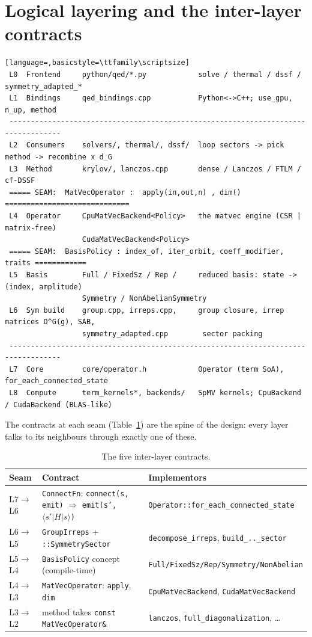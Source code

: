 \documentclass[11pt]{article}
\newcommand{\code}[1]{\texttt{\small #1}}
\begin{document}
\section{Logical layering and the inter-layer contracts}

\begin{center}
\begin{lstlisting}[language=,basicstyle=\ttfamily\scriptsize]
 L0  Frontend     python/qed/*.py            solve / thermal / dssf / symmetry_adapted_*
 L1  Bindings     qed_bindings.cpp           Python<->C++; use_gpu, n_up, method
 ----------------------------------------------------------------------------------
 L2  Consumers    solvers/, thermal/, dssf/  loop sectors -> pick method -> recombine x d_G
 L3  Method       krylov/, lanczos.cpp       dense / Lanczos / FTLM / cf-DSSF
 ===== SEAM:  MatVecOperator :  apply(in,out,n) , dim() =============================
 L4  Operator     CpuMatVecBackend<Policy>   the matvec engine (CSR | matrix-free)
                  CudaMatVecBackend<Policy>
 ===== SEAM:  BasisPolicy : index_of, iter_orbit, coeff_modifier, traits ============
 L5  Basis        Full / FixedSz / Rep /     reduced basis: state -> (index, amplitude)
                  Symmetry / NonAbelianSymmetry
 L6  Sym build    group.cpp, irreps.cpp,     group closure, irrep matrices D^G(g), SAB,
                  symmetry_adapted.cpp        sector packing
 ----------------------------------------------------------------------------------
 L7  Core         core/operator.h            Operator (term SoA), for_each_connected_state
 L8  Compute      term_kernels*, backends/   SpMV kernels; CpuBackend / CudaBackend (BLAS-like)
\end{lstlisting}
\end{center}

The contracts at each seam (Table~\ref{tab:contracts}) are the spine of
the design: every layer talks to its neighbours through exactly one of
these.

\begin{table}[h]
\centering\small
\begin{tabular}{@{}lll@{}}
\toprule
Seam & Contract & Implementors \\
\midrule
L7$\to$L6 & \code{ConnectFn}: \code{connect(s, emit)} $\Rightarrow$ \code{emit(s', $\langle s'|H|s\rangle$)} & \code{Operator::for\_each\_connected\_state} \\
L6$\to$L5 & \code{GroupIrreps} + \code{::SymmetrySector} & \code{decompose\_irreps}, \code{build\_..\_sector} \\
L5$\to$L4 & \code{BasisPolicy} concept (compile-time) & \code{Full/FixedSz/Rep/Symmetry/NonAbelian} \\
L4$\to$L3 & \code{MatVecOperator}: \code{apply}, \code{dim} & \code{CpuMatVecBackend}, \code{CudaMatVecBackend} \\
L3$\to$L2 & method takes \code{const MatVecOperator\&} & \code{lanczos}, \code{full\_diagonalization}, \dots \\
\bottomrule
\end{tabular}
\caption{The five inter-layer contracts.}
\label{tab:contracts}
\end{table}
\end{document}
